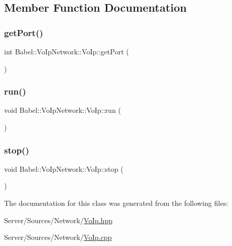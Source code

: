 \subsection{Member Function Documentation}
\mbox{\label{classBabel_1_1VoIpNetwork_1_1VoIp_a8584ff9891a393dd01dfa0407cd5e7fb}} 
\subsubsection{\texorpdfstring{get\+Port()}{getPort()}}
{\footnotesize\ttfamily int Babel\+::\+Vo\+Ip\+Network\+::\+Vo\+Ip\+::get\+Port (\begin{DoxyParamCaption}{ }\end{DoxyParamCaption})}

\mbox{\label{classBabel_1_1VoIpNetwork_1_1VoIp_a4cb124cfa4efba921d49a9d4016dc2f7}} 
\subsubsection{\texorpdfstring{run()}{run()}}
{\footnotesize\ttfamily void Babel\+::\+Vo\+Ip\+Network\+::\+Vo\+Ip\+::run (\begin{DoxyParamCaption}{ }\end{DoxyParamCaption})}

\mbox{\label{classBabel_1_1VoIpNetwork_1_1VoIp_a3189b0e42439fd8a17ac63d5a2693e13}} 
\subsubsection{\texorpdfstring{stop()}{stop()}}
{\footnotesize\ttfamily void Babel\+::\+Vo\+Ip\+Network\+::\+Vo\+Ip\+::stop (\begin{DoxyParamCaption}{ }\end{DoxyParamCaption})}



The documentation for this class was generated from the following files\+:\begin{DoxyCompactItemize}
\item 
Server/\+Sources/\+Network/\hyperlink{VoIp_8hpp}{Vo\+Ip.\+hpp}\item 
Server/\+Sources/\+Network/\hyperlink{VoIp_8cpp}{Vo\+Ip.\+cpp}\end{DoxyCompactItemize}
